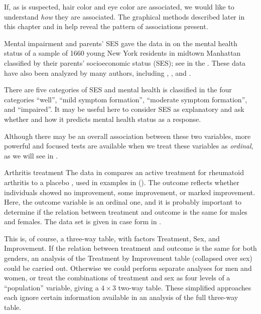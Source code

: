 \documentclass[11pt]{book}
\begin{document}
If, as is suspected, hair color and eye color are associated,
we would like to understand \emph{how} they are associated.
The graphical methods described later in this chapter 
and in  help
reveal the pattern of associations present.


\begin{Example}[mental1]{Mental impairment and parents' SES}
\citet[p. 289]{Srole-etal:78} gave the data 
in  on the mental
health status of a sample of 1660 young New York residents in midtown Manhattan
classified by their parents' socioeconomic status (SES);
see  in the .
These data have also been analyzed by many authors, including
\citet[ \S 10.5.3]{Agresti:2013},
\citet{Goodman:79}, and
\citet[p. 375]{Haberman:79}. 

There are five categories of SES and mental health is classified
in the four categories ``well'', ``mild symptom formation'',
``moderate symptom formation'', and ``impaired''.
It may be useful here to consider SES as explanatory
and ask whether and how it predicts mental health status as
a response.

Although there may be an overall association between these two
variables, more powerful and focused tests are available
when we treat these variables as \emph{ordinal}, as we will see in
.
\end{Example}

\begin{Example}[arthrit1]{Arthritis treatment}
The data in  compares an active treatment for rheumatoid
arthritis to a placebo
\citep{KochEdwards:88}, used in examples in 
().
The outcome reflects
whether individuals showed no improvement, some improvement, or
marked improvement.
Here, the outcome variable is an ordinal one, and it is probably
important to determine if the relation between treatment and outcome
is the same for males and females.
The data set is given in case form in .


This is, of course, a three-way table, with factors
Treatment, Sex, and Improvement.
If the relation between treatment and outcome is the same for
both genders, an analysis of the Treatment by Improvement
table (collapsed over sex) could be carried out.
Otherwise we could perform separate analyses for
men and women, or
treat the combinations of treatment and sex as four levels of
a ``population'' variable, giving a $4 \times 3$ two-way table.
These simplified approaches each ignore certain information
available in
an analysis of the full three-way table.
\end{Example}
\end{document}
